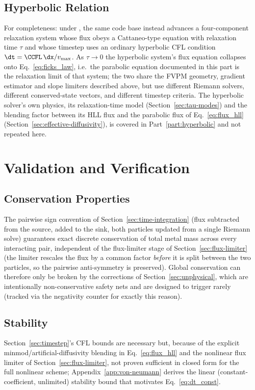 \subsection{Hyperbolic Relation}
\label{sec:hyperbolic-relation}
For completeness: under
, the same code base
instead advances a four-component relaxation system whose flux obeys a
Cattaneo-type equation with relaxation time $\tau$ and whose timestep
uses an ordinary hyperbolic CFL condition
$\dt = \CCFL\, \dx/v_{\max}$. As $\tau\to0$ the hyperbolic system's
flux equation collapses onto Eq.~\eqref{eq:ficks_law}, i.e.\ the
parabolic equation documented in this part is the relaxation limit of
that system; the two share the FVPM geometry, gradient estimator and
slope limiters described above, but use different Riemann solvers,
different conserved-state vectors, and different timestep criteria. The
hyperbolic solver's own physics, its relaxation-time model
(Section~\ref{sec:tau-modes}) and the blending factor between its HLL
flux and the parabolic flux of Eq.~\eqref{eq:flux_hll}
(Section~\ref{sec:effective-diffusivity}), is covered in
Part~\ref{part:hyperbolic} and not repeated here.

\section{Validation and Verification}

\subsection{Conservation Properties}
The pairwise sign convention of Section~\ref{sec:time-integration}
(flux subtracted from the source, added to the sink, both particles
updated from a single Riemann solve) guarantees exact discrete
conservation of total metal mass across every interacting pair,
independent of the flux-limiter stage of Section~\ref{sec:flux-limiter}
(the limiter rescales the flux by a common factor \emph{before} it is
split between the two particles, so the pairwise anti-symmetry is
preserved). Global conservation can therefore only be broken by the
 corrections of Section~\ref{sec:unphysical}, which are
intentionally non-conservative safety nets and are designed to trigger
rarely (tracked via the negativity counter for exactly this reason).

\subsection{Stability}
Section~\ref{sec:timestep}'s CFL bounds are necessary but, because of
the explicit minmod/artificial-diffusivity blending in
Eq.~\eqref{eq:flux_hll} and the nonlinear flux limiter of
Section~\ref{sec:flux-limiter}, not proven sufficient in closed form for
the full nonlinear scheme; Appendix~\ref{app:von-neumann} derives the
linear (constant-coefficient, unlimited) stability bound that motivates
Eq.~\eqref{eq:dt_const}.

